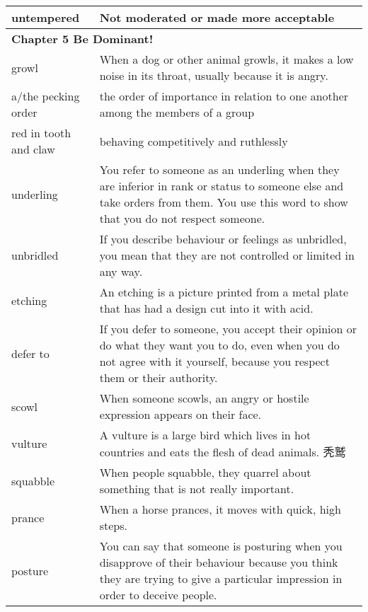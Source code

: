 \documentclass{article}
\begin{document}
\begin{center}
\begin{longtable}{|l|p{9cm}|}
\hline
untempered
&
Not moderated or made more acceptable
\\

\hline
\multicolumn{2}{|l|}{\textbf{Chapter 5 Be Dominant!}}\\

\hline
growl
&
When a dog or other animal growls, it makes a low noise in its throat, usually because it is angry.
\\

\hline
a/the pecking order
&
the order of importance in relation to one another among the members of a group
\\

\hline
red in tooth and claw
&
behaving competitively and ruthlessly
\\

\hline
underling
&
You refer to someone as an underling when they are inferior in rank or status to someone else and take orders from them. You use this word to show that you do not respect someone.
\\

\hline
unbridled
&
If you describe behaviour or feelings as unbridled, you mean that they are not controlled or limited in any way.
\\

\hline
etching
&
An etching is a picture printed from a metal plate that has had a design cut into it with acid.
\\

\hline
defer to
&
If you defer to someone, you accept their opinion or do what they want you to do, even when you do not agree with it yourself, because you respect them or their authority.
\\

\hline
scowl
&
When someone scowls, an angry or hostile expression appears on their face.
\\

\hline
vulture
&
A vulture is a large bird which lives in hot countries and eats the flesh of dead animals. 秃鹫
\\

\hline
squabble
&
When people squabble, they quarrel about something that is not really important.
\\

\hline
prance
&
When a horse prances, it moves with quick, high steps.
\\

\hline
posture
&
You can say that someone is posturing when you disapprove of their behaviour because you think they are trying to give a particular impression in order to deceive people.
\\


\end{longtable}
\end{center}
\end{document}

